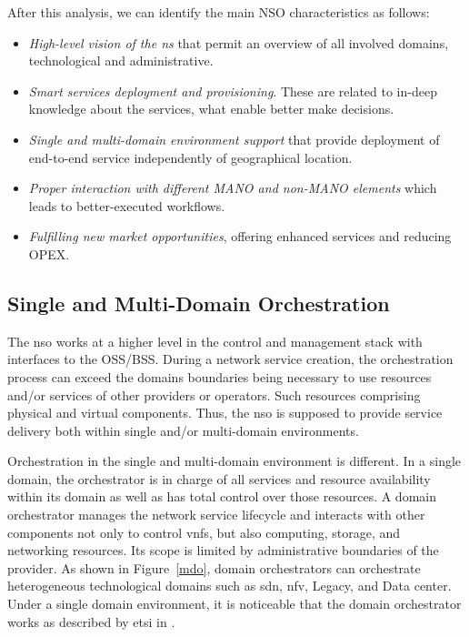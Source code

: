 After this analysis, we can identify the main NSO characteristics as follows: 
\begin{itemize}
\item \textit{High-level vision of the \gls{ns}} that permit an overview of all involved domains, technological and administrative. 
\item \textit{Smart services deployment and provisioning}. These are related to in-deep knowledge about the services, what enable better make decisions. 
\item \textit{Single and multi-domain environment support} that provide deployment of end-to-end service independently of geographical location.
\item \textit{Proper interaction with different MANO and non-MANO elements} which leads to better-executed workflows.
\item \textit{Fulfilling new market opportunities}, offering enhanced services and reducing OPEX.    
\end{itemize}

\subsection{Single and Multi-Domain Orchestration}
\label{sec:domain}

The \gls{nso} works at a higher level in the control and management stack with interfaces to the OSS/BSS. During a network service creation, the orchestration process can exceed the domains boundaries being necessary to use resources and/or services of other providers or operators. Such resources comprising physical and virtual components. Thus, the \gls{nso} is supposed to provide service delivery both within single and/or multi-domain environments.

Orchestration in the single and multi-domain environment is different. In a single domain, the orchestrator is in charge of all services and resource availability within its domain as well as has total control over those resources. A domain orchestrator manages the network service lifecycle and interacts with other components not only to control \glspl{vnf}, but also computing, storage, and networking resources. Its scope is limited by administrative boundaries of the provider. As shown in Figure~\ref{mdo}, domain orchestrators can orchestrate heterogeneous technological domains such as \gls{sdn}, \gls{nfv}, Legacy, and Data center. Under a single domain environment, it is noticeable that the domain orchestrator works as described by \gls{etsi} in \cite{ETSIIndustrySpecificationGroupISGNFV2014NetworkOptions}. 


